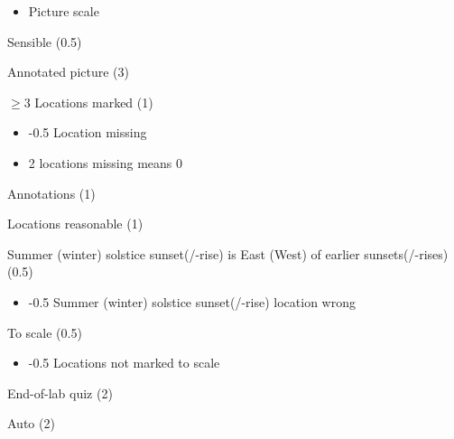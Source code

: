 \documentclass[12pt]{article}
\begin{document}
\begin{longenum}
\begin{longenum}
\begin{longenum}
\begin{longenum}
\begin{itemize}
                    \item Picture scale
                    \end{itemize}
                \item Sensible (0.5)
                \end{longenum}
            \end{longenum}
            \item Annotated picture (3)
                \begin{longenum}
                \item $\geq 3$ Locations marked (1)
                    \begin{itemize}
                    \item -0.5 Location missing
                    \item 2 locations missing means 0
                    \end{itemize}
                \item Annotations (1)
                \item Locations reasonable (1)
                    \begin{longenum}
                    \item Summer (winter) solstice sunset(/-rise) is East (West) of earlier sunsets(/-rises) (0.5)
                        \begin{itemize}
                        \item -0.5 Summer (winter) solstice sunset(/-rise) location wrong 
                        \end{itemize}
                    \item To scale (0.5)
                        \begin{itemize}
                        \item -0.5 Locations not marked to scale
                        \end{itemize}
                    \end{longenum}
                \end{longenum}
    \end{longenum}
\item End-of-lab quiz (2)
    \begin{longenum}
    \item Auto (2)
    \end{longenum}
\end{longenum}
\end{document}
